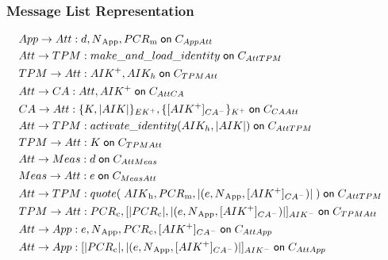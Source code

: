 \documentclass{beamer}
\def \app {App}
\def \att {Att}
\def \ca {CA}
\def \mea {Meas}
\def \tp {TPM}
\def \pmask {PCR\textsubscript{m}}
\def \pcomp {PCR\textsubscript{c}}
\def \evd {d}
\def \eve {e}
\def \cacert {\sign {\public{AIK}}{CA}}
\def \exdata {\hash{(\eve, \nonce{\app}, \cacert ) }}
\def \aikh {AIK_h}
\begin{document}
\begin{frame}
  \frametitle{Message List Representation}
  \begin{small}
  \begin{align*}
  & \sndmsg {\app}{\att} {\evd, \nonce{\app}, \pmask} {\channel {\app \att}}  & \\
  & \sndmsg{\att}{\tp} {make\_and\_load\_identity} {\channel {\att \tp}} & \\
  & \sndmsg{\tp}{\att} {\public{AIK}, \aikh} {\channel {\tp \att}} & \\
  & \sndmsg{\att}{\ca} {\att, \public{AIK}} {\channel {\att \ca}} & \\
  & \sndmsg{\ca}{\att} {\encrypt{K, \hash{AIK}}{EK}, \encrypt{\cacert}{K}} {\channel {\ca \att}}& \\
  & \sndmsg{\att}{\tp} {activate\_identity({\aikh, \hash{AIK})}} {\channel {\att \tp}} & \\
  & \sndmsg{\tp}{\att} {K} {\channel {\tp \att}} & \\
  & \sndmsg{\att}{\mea} {\evd} {\channel {\att \mea}} & \\
  & \sndmsg{\mea}{\att} {\eve} {\channel {\mea \att}} & \\
  & \sndmsg{\att}{\tp} {quote(\;{AIK\textsubscript{h}, \pmask, \exdata}\;)} {\channel {\att \tp}} & \\
  & \sndmsg{\tp}{\att} {\pcomp, \sign{\hash{\pcomp}, \exdata}{AIK}} {\channel {\tp \att}} & \\
  & \sndmsg{\att}{\app} {\eve, \nonce{\app}, \pcomp, \cacert} {\channel {\att \app}} & \\
  & \sndmsg{\att}{\app} {\sign{\hash{\pcomp}, \exdata}{AIK}} {\channel {\att \app}} & 
\end{align*}
\end{small}
\end{frame}
\end{document}
